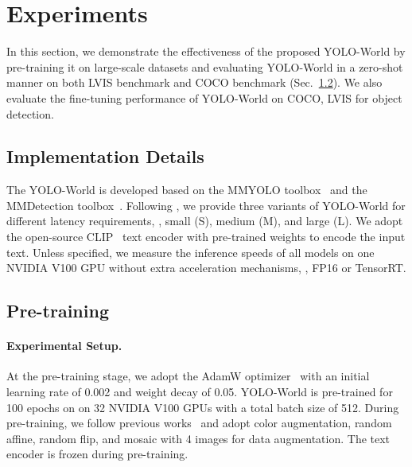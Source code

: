 \documentclass[10pt,twocolumn,letterpaper]{article}
\newcommand{\name}{YOLO-World}
\begin{document}
    




\section{Experiments}
\label{sec:experiments}
In this section, we demonstrate the effectiveness of the proposed \name{} by pre-training it on large-scale datasets and evaluating \name{} in a zero-shot manner on both LVIS benchmark and COCO benchmark (Sec.~\ref{subsec:pretrain}).
We also evaluate the fine-tuning performance of \name{} on COCO, LVIS for object detection.

\subsection{Implementation Details}
The \name{} is developed based on the MMYOLO toolbox~\cite{mmyolo2022} and the MMDetection toolbox~\cite{mmdetection}.
Following \cite{yolov8_ultralytics}, we provide three variants of \name{} for different latency requirements, \eg, small (S), medium (M), and large (L).
We adopt the open-source CLIP~\cite{CLIP} text encoder with pre-trained weights to encode the input text.
Unless specified, we measure the inference speeds of all models on one NVIDIA V100 GPU without extra acceleration mechanisms, \eg, FP16 or TensorRT.

\subsection{Pre-training}
\label{subsec:pretrain}
\paragraph{Experimental Setup.}
At the pre-training stage, we adopt the AdamW optimizer~\cite{AdamW} with an initial learning rate of 0.002 and weight decay of 0.05.
\name{} is pre-trained for 100 epochs on on 32 NVIDIA V100 GPUs with a total batch size of 512.
During pre-training, we follow previous works~\cite{yolov8_ultralytics} and adopt color augmentation, random affine, random flip, and mosaic with 4 images for data augmentation.
The text encoder is frozen during pre-training.
\end{document}
